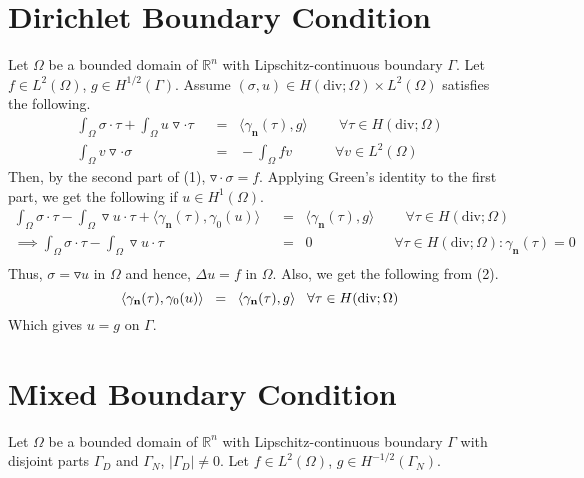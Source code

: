 \documentclass[12pt]{article}
\begin{document}
\section{Dirichlet Boundary Condition}
Let $\Omega$ be a bounded domain of $\mathbb{R}^n$ with Lipschitz-continuous boundary $\Gamma$. Let
 $f\in L^2(\Omega)$, $g\in H^{1/2}(\Gamma)$. Assume $(\sigma,u)\in H(\text{div};\Omega)\times L^2(\Omega)$ satisfies the following.
\begin{equation}
\begin{split}
\int_{\Omega}\sigma\cdot\tau +\int_{\Omega}u \triangledown \cdot \tau & \;\;=\;\;  \langle \gamma_{\textbf{n}}(\tau),g \rangle \;\;\;\;\;\;\;\;\forall\tau\in H(\text{div};\Omega)\\
\int_{\Omega}v \triangledown \cdot \sigma & \;\;=\;\; -\int_{\Omega}fv\;\;\;\;\;\;\;\;\;\;\;\forall v \in L^2(\Omega)
\end{split}
\end{equation}
Then, by the second part of (1), $\triangledown\cdot \sigma=f$. Applying Green's identity to the first part, we get the following if $u\in H^1(\Omega)$.
\begin{equation}
\begin{split}
\int_{\Omega}\sigma\cdot\tau -\int_{\Omega}\triangledown u\cdot \tau +  \langle \gamma_{\textbf{n}}(\tau),\gamma_0 (u) \rangle  \;\;&=\;\;  \langle \gamma_{\textbf{n}}(\tau),g \rangle \;\;\;\;\;\;\;\;\forall\tau\in H(\text{div};\Omega)\\
\implies
\int_{\Omega}\sigma\cdot\tau -\int_{\Omega}\triangledown u\cdot \tau   \;\;&=\;\; 0\;\;\;\;\;\;\;\;\;\;\;\;\;\;\;\;\;\;\;\;\;\forall\tau\in H(\text{div};\Omega):\gamma_{\textbf{n}}(\tau)=0\\
\end{split}
\end{equation}
Thus, $\sigma=\triangledown u$ in $\Omega$ and hence, $\Delta u=f$ in $\Omega$. Also, we get the following from (2).
$$ \langle \gamma_{\textbf{n}}(\tau),\gamma_0 (u) \rangle  \;\;=\;\;  \langle \gamma_{\textbf{n}}(\tau),g \rangle \;\;\;\forall\tau\in H(\text{div};\Omega)\\$$
Which gives $u=g$ on $\Gamma$.

\section{Mixed Boundary Condition}
Let $\Omega$ be a bounded domain of $\mathbb{R}^n$ with Lipschitz-continuous boundary $\Gamma$ with disjoint parts $\Gamma_D$ and $\Gamma_N$, $|\Gamma_D|\ne 0$. Let
 $f\in L^2(\Omega)$, $g\in H^{-1/2}(\Gamma_N)$.
 
\end{document}
